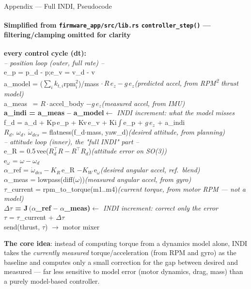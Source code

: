 \documentclass[aspectratio=169,11pt]{beamer}
\begin{document}
\begin{frame}{Appendix --- Full INDI, Pseudocode}
\framesubtitle{Simplified from \texttt{firmware\_app/src/lib.rs} \texttt{controller\_step()} --- filtering/clamping omitted for clarity}
\ttfamily\scriptsize
\textbf{every control cycle (dt):}\\[2pt]
\textit{-- position loop (outer, full rate) --}\\
e\_p = p\_d - p;\quad e\_v = v\_d - v\\
a\_model = ($\sum_i k_{t,i}$rpm$_i^2$)/mass $\cdot\, R\,e_z - g\,e_z$\quad\textit{\small(predicted accel, from RPM\textsuperscript{2} thrust model)}\\
a\_meas~ = $R\cdot$accel\_body $- g\,e_z$\quad\textit{\small(measured accel, from IMU)}\\
\textbf{a\_indi = a\_meas -- a\_model}\quad\textit{\small $\leftarrow$ INDI increment: what the model misses}\\
f\_d = a\_d + Kp$\,$e\_p + Kv$\,$e\_v + Ki$\int$e\_p + $g\,e_z$ + a\_indi\\
$R_d,\ \omega_d,\ \dot\omega_{des}$ = flatness(f\_d$\cdot$mass, yaw\_d)\quad\textit{\small(desired attitude, from planning)}\\[3pt]
\textit{-- attitude loop (inner), the "full INDI" part --}\\
e\_R = 0.5$\,$vee($R_d^\top R - R^\top R_d$)\quad\textit{\small(attitude error on SO(3))}\\
e$_\omega$ = $\omega - \omega_d$\\
$\alpha$\_ref = $\dot\omega_{des} - K_R\,$e\_R $- K_W\,$e$_\omega$\quad\textit{\small(desired angular accel, ref.\ blend)}\\
$\alpha$\_meas = lowpass(diff($\omega$))\quad\textit{\small(measured angular accel, from gyro)}\\
$\tau$\_current = rpm\_to\_torque(m1..m4)\quad\textit{\small(current torque, from motor RPM --- not a model)}\\
\textbf{$\Delta\tau$ = J$\,(\alpha$\_ref -- $\alpha$\_meas)}\quad\textit{\small $\leftarrow$ INDI increment: correct only the error}\\
$\tau$ = $\tau$\_current + $\Delta\tau$\\[3pt]
send(thrust, $\tau$) $\to$ motor mixer
\normalfont
\vspace{0.2cm}

\begin{footnotesize}
\textbf{The core idea}: instead of computing torque from a dynamics model alone, INDI takes the
\emph{currently measured} torque/acceleration (from RPM and gyro) as the baseline and computes
only a small correction for the gap between desired and measured --- far less sensitive to model
error (motor dynamics, drag, mass) than a purely model-based controller.
\end{footnotesize}
\end{frame}
\end{document}
